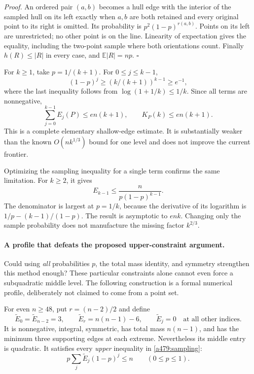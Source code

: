 \documentclass[11pt]{article}
\begin{document}
\emph{Proof.} An ordered pair $(a,b)$ becomes a hull edge with the
interior of the sampled hull on its left exactly when $a,b$ are both
retained and every original point to its right is omitted. Its probability
is $p^2(1-p)^{r(a,b)}$. Points on its left are unrestricted; no other
point is on the line. Linearity of expectation gives the equality,
including the two-point sample where both orientations count. Finally
$h(R)\leq|R|$ in every case, and $\mathbb E|R|=np$.
\hfill$\square$

For $k\geq1$, take $p=1/(k+1)$. For $0\leq j\leq k-1$,
\[
            (1-p)^j\geq(k/(k+1))^{k-1}\geq e^{-1},
\]
where the last inequality follows from
$\log(1+1/k)\leq1/k$. Since all terms are nonnegative,
\begin{equation}\label{a479:shallow}
       \sum_{j=0}^{k-1}E_j(P)\leq e n(k+1),\qquad
                            K_P(k)\leq e n(k+1).
\end{equation}
This is a complete elementary shallow-edge estimate. It is substantially
weaker than the known $O(nk^{1/3})$ bound for one level and does not
improve the current frontier.

Optimizing the sampling inequality for a single term confirms the same
limitation. For $k\geq2$, it gives
\[
                      E_{k-1}\leq\frac{n}{p(1-p)^{k-1}}.
\]
The denominator is largest at $p=1/k$, because the derivative of its
logarithm is $1/p-(k-1)/(1-p)$. The result is asymptotic to $enk$.
Changing only the sample probability does not manufacture the missing
factor $k^{2/3}$.

\paragraph{A profile that defeats the proposed upper-constraint argument.}
Could using \emph{all} probabilities $p$, the total mass identity, and
symmetry strengthen this method enough? These particular constraints
alone cannot even force a subquadratic middle level. The following
construction is a formal numerical profile, deliberately not claimed to
come from a point set.

For even $n\geq48$, put $r=(n-2)/2$ and define
\begin{equation}\label{a479:fakeprofile}
 \widetilde E_0=\widetilde E_{n-2}=3,\qquad
 \widetilde E_r=n(n-1)-6,\qquad
 \widetilde E_j=0\quad\text{at all other indices}.
\end{equation}
It is nonnegative, integral, symmetric, has total mass $n(n-1)$, and
has the minimum three supporting edges at each extreme. Nevertheless
its middle entry is quadratic. It satisfies every \emph{upper} inequality
in \eqref{a479:sampling}:
\begin{equation}\label{a479:fakeupper}
                p\sum_j\widetilde E_j(1-p)^j\leq n
                              \qquad(0\leq p\leq1).
\end{equation}
\end{document}
